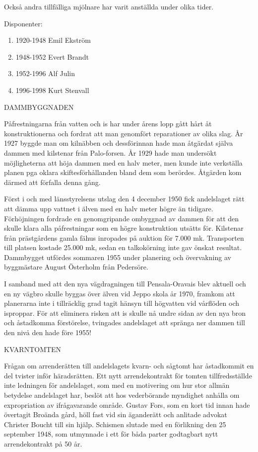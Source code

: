 Också andra tillfälliga mjölnare har varit anställda under olika tider.

Disponenter:
\begin{enumerate}
  \item 1920-1948		Emil Ekström
  \item 1948-1952		Evert Brandt
  \item 1952-1996		Alf Julin
  \item 1996-1998	  Kurt Stenvall
\end{enumerate}


DAMMBYGGNADEN

Påfrestningarna från vatten och is har under årens lopp gått hårt åt konstruktionerna och fordrat att man genomfört reparationer av olika slag. År 1927 byggde man om kilnäbben och dessförinnan hade man åtgärdat själva dammen med kilstenar från Palo-forsen. År 1929 hade man undersökt möjligheterna att höja dammen med en halv meter, men kunde inte verkställa planen pga oklara skiftesförhållanden bland dem som berördes. Åtgärden kom därmed att förfalla denna gång.

Först i och med länsstyrelsens utslag den 4 december 1950 fick andelslaget rätt att dämma upp vattnet i älven med en halv meter högre än tidigare. Förhöjningen fordrade en genomgripande ombyggnad av dammen för att den skulle klara alla påfrestningar som en högre konstruktion utsätts för. Kilstenar från prästgårdens gamla fähus inropades på auktion för 7.000 mk. Transporten till platsen kostade 25.000 mk, sedan en talkokörning inte gav önskat resultat. Dammbygget utfördes sommaren 1955 under planering och övervakning av byggmästare August Österholm från Pedersöre.

I samband med att den nya vägdragningen till Pensala-Oravais blev aktuell och en ny vägbro skulle byggas över älven vid Jeppo skola år 1970,  framkom att planerarna inte i tillräcklig grad tagit hänsyn till högvatten vid vårflöden och isproppar. För att eliminera risken att is skulle nå undre sidan av den nya bron och åstadkomma förstörelse, tvingades andelslaget att spränga ner dammen till den nivå den hade före 1955!


KVARNTOMTEN

Frågan om arrenderätten till andelslagets kvarn- och sågtomt har åstadkommit en del tvister inför häradsrätten. Ett nytt arrendekontrakt för tomten tillfredsställde inte ledningen för andelslaget, som med en motivering om hur stor allmän betydelse andelslaget har, beslöt att hos vederbörande myndighet anhålla om expropriation av ifrågavarande område. Gustav Fors, som en kort tid innan hade övertagit Broända gård, höll fast vid sin äganderätt och anlitade advokat Christer Boucht till sin hjälp. Schismen slutade med en förlikning den 25 september 1948, som utmynnade i ett för båda parter godtagbart nytt arrendekontrakt på 50 år.

